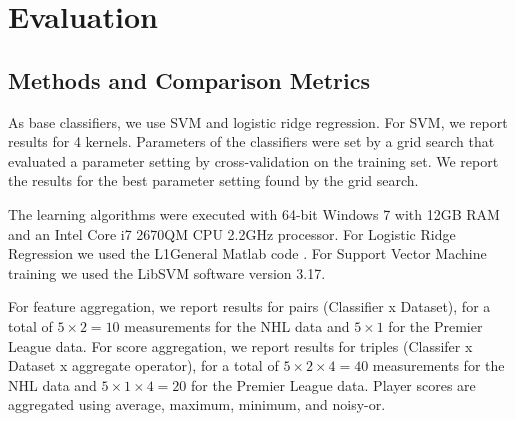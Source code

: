 \documentclass[conference]{IEEEtran}
\begin{document}
%
%
%
%
%
\section{Evaluation} 


\subsection{Methods and Comparison Metrics} As base classifiers, we use SVM and logistic ridge regression. For SVM, we report results for 4 kernels. Parameters of the classifiers were set by a grid search that evaluated a parameter setting by cross-validation on the training set. We report the results for the best parameter setting found by the grid search.

The learning algorithms were executed with 64-bit Windows 7 with 12GB RAM and an Intel Core i7 2670QM CPU 2.2GHz processor. For Logistic Ridge Regression we used the L1General Matlab code \cite{bib:l1general}. For Support Vector Machine training we used the LibSVM software version 3.17.


For feature aggregation, we report results for pairs (Classifier x Dataset), for a total of $ 5 \times 2 = 10$ measurements for the NHL data and $5 \times 1$ for the Premier League data. For score aggregation, we report results for triples (Classifer x Dataset x aggregate operator), for a total of $5 \times 2 \times 4 = 40$ measurements for the NHL data and $5 \times 1 \times 4 = 20$ for the Premier League data. Player scores are aggregated using average, maximum, minimum, and noisy-or.
\end{document}
